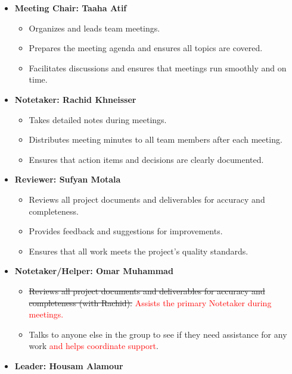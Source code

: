 \documentclass{article}
\begin{document}
\begin{itemize}
    \item \textbf{Meeting Chair: Taaha Atif}
    \begin{itemize}
        \item Organizes and leads team meetings.
        \item Prepares the meeting agenda and ensures all topics are covered.
        \item Facilitates discussions and ensures that meetings run smoothly and on time.
    \end{itemize}

    \item \textbf{Notetaker: Rachid Khneisser}
    \begin{itemize}
        \item Takes detailed notes during meetings.
        \item Distributes meeting minutes to all team members after each meeting.
        \item Ensures that action items and decisions are clearly documented.
    \end{itemize}

    \item \textbf{Reviewer: Sufyan Motala}
    \begin{itemize}
        \item Reviews all project documents and deliverables for accuracy and completeness.
        \item Provides feedback and suggestions for improvements.
        \item Ensures that all work meets the project’s quality standards.
    \end{itemize}

    \item \textbf{Notetaker/Helper: Omar Muhammad}
    \begin{itemize}
        \item \sout{Reviews all project documents and deliverables for accuracy and completeness (with Rachid).} \textcolor{red}{Assists the primary Notetaker during meetings.}
        \item Talks to anyone else in the group to see if they need assistance for any work \textcolor{red}{and helps coordinate support}.
    \end{itemize}

    \item \textbf{Leader: Housam Alamour}
\end{itemize}
\end{document}

